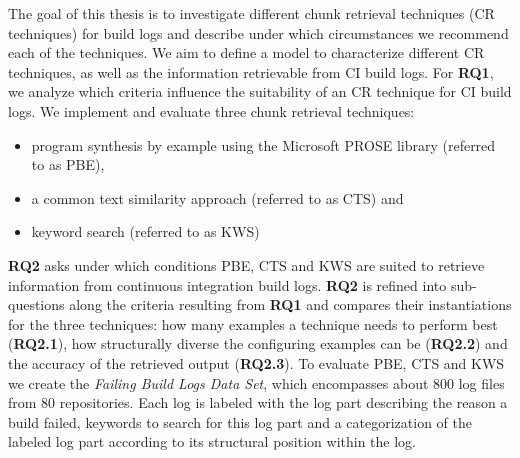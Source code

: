 \documentclass[\myrootdir/main.tex]{subfiles}
\begin{document}
The goal of this thesis is to investigate different chunk retrieval techniques (CR techniques) for build logs and describe under which circumstances we recommend each of the techniques.
We aim to define a model to characterize different CR techniques, as well as the information retrievable from CI build logs.
For \textbf{RQ1}, we analyze which criteria influence the suitability of an CR technique for CI build logs.
We implement and evaluate three chunk retrieval techniques:
\begin{itemize}
  \item program synthesis by example using the Microsoft PROSE library (referred to as PBE),
  \item a common text similarity approach (referred to as CTS) and
  \item keyword search (referred to as KWS)
\end{itemize}
\textbf{RQ2} asks under which conditions PBE, CTS and KWS are suited to retrieve information from continuous integration build logs.
\textbf{RQ2} is refined into sub-questions along the criteria resulting from \textbf{RQ1} and compares their instantiations for the three techniques:
how many examples a technique needs to perform best (\textbf{RQ2.1}), how structurally diverse the configuring examples can be (\textbf{RQ2.2}) and the accuracy of the retrieved output (\textbf{RQ2.3}).
To evaluate PBE, CTS and KWS we create the \emph{Failing Build Logs Data Set}, which encompasses about 800 log files from 80 repositories.
Each log is labeled with the log part describing the reason a build failed, keywords to search for this log part and a categorization of the labeled log part according to its structural position within the log.
\end{document}
